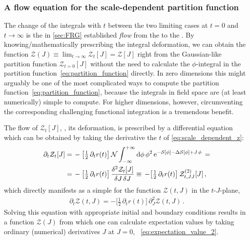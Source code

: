 \FloatBarrier
\subsubsection{A flow equation for the scale-dependent partition function}
\label{subsec:flow_equation_of_the_partition_function}

The change of the integrals with $t$ between the two limiting cases at $t=0$ and $t\rightarrow\infty$ is the in \cref{sec:FRG} established \textit{\frg{} flow} from the \uv{} to the \ir{}.
By knowing/mathematically prescribing the integral deformation, we can obtain the function ${\mathcal{Z}(J) \equiv \lim_{t \rightarrow \infty} \mathcal{Z}_t [J] = \mathcal{Z}[J]}$ right from the Gaussian-like partition function $\mathcal{Z}_{t = 0}[J]$ without the need to calculate the $\phi$-integral in the partition function~\eqref{eq:partition_function} directly.
In zero dimensions this might arguably be one of the most complicated ways to compute the partition function~\eqref{eq:partition_function}, because the integrals in field space are (at least numerically) simple to compute.
For higher dimensions, however, circumventing the corresponding challenging functional integration is a tremendous benefit.\bigskip

The \frg{} flow of $\mathcal{Z}_t [J]$, \ie{}, its deformation, is prescribed by a differential equation which can be obtained by taking the derivative \wrt{} the \rgtime{} $t$ of \cref{eq:scale_dependent_z}:
\begin{subequations}\label{eq:pde_zF}
\begin{align}
		\partial_t \mathcal{Z}_t[J] =	\, & - \big[ \tfrac{1}{2} \, \partial_t r ( t ) \big] \, \mathcal{N} \int_{-\infty}^{+\infty} \dif \phi \, \phi^2 \, \eu^{ - \mathcal{S}[\phi] - \Delta \mathcal{S}[\phi] + J \, \phi}\, =\\
		=\,& - \big[ \tfrac{1}{2} \, \partial_t r ( t ) \big] \, \frac{\delta^2 \mathcal{Z}_t [J]}{\delta J \, \delta J} \equiv \,  - \big[ \tfrac{1}{2} \, \partial_t r ( t ) \big] \, \mathcal{Z}^{(2)}_{t, J J} [J] \, ,	
	\end{align}
\end{subequations}
which directly manifests as a simple \pde{} for the function $\mathcal{Z} ( t, J )$ in the $t$-$J$-plane,
\begin{align}
	\partial_t \mathcal{Z}(t,J) = - \big[ \tfrac{1}{2} \, \partial_t r ( t ) \big] \, \partial_J^2 \mathcal{Z}(t,J) \, .	\label{eq:pde_z}
\end{align}
Solving this equation with appropriate initial and boundary conditions results in a function $\mathcal{Z} ( J )$ from which one can calculate expectation values by taking ordinary (numerical) derivatives \wrt{} $J$ at $J = 0$, \cf{}\ \cref{eq:expectation_value_2}.

